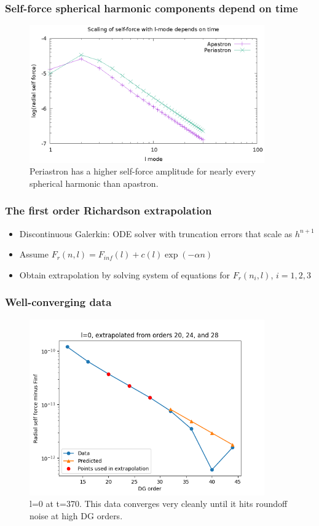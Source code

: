 \documentclass{beamer}
\begin{document}
\begin{frame}
  \frametitle{Self-force spherical harmonic components depend on time}
  \begin{figure}
    \includegraphics[width=0.9\textwidth]{lmodescalingdependsontime}
    \caption{Periastron has a higher self-force amplitude for nearly every spherical harmonic than apastron.}
  \end{figure}
\end{frame}

\begin{frame}
  \frametitle{The first order Richardson extrapolation}
  \begin{itemize}
  \item Discontinuous Galerkin: ODE solver with truncation errors that scale as $h^{n+1}$
  \item Assume $F_r(n,l)=F_{inf}(l)+c(l)\exp(-\alpha n)$
  \item Obtain extrapolation by solving system of equations for $F_r(n_i,l)$, $i=1,2,3$
   \end{itemize}
\end{frame}

\begin{frame}
  \frametitle{Well-converging data}
  \begin{figure}
  \includegraphics[width=0.9\textwidth]{fittingtechniqet370l0}
  \caption{l=0 at t=370. This data converges very cleanly until it hits roundoff noise at high DG orders.}
  \end{figure}
\end{frame}
  
\end{document}
